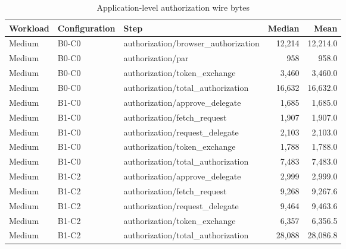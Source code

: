 \begin{table}[htbp]
\centering
\caption{Application-level authorization wire bytes}
\label{tab:evaluation-wire-bytes}
\begin{tabular}{lllrr}
\hline
Workload & Configuration & Step & Median & Mean \\
\hline
Medium & B0-C0 & authorization/browser\_authorization & 12{,}214 & 12{,}214.0 \\
Medium & B0-C0 & authorization/par & 958 & 958.0 \\
Medium & B0-C0 & authorization/token\_exchange & 3{,}460 & 3{,}460.0 \\
Medium & B0-C0 & authorization/total\_authorization & 16{,}632 & 16{,}632.0 \\
Medium & B1-C0 & authorization/approve\_delegate & 1{,}685 & 1{,}685.0 \\
Medium & B1-C0 & authorization/fetch\_request & 1{,}907 & 1{,}907.0 \\
Medium & B1-C0 & authorization/request\_delegate & 2{,}103 & 2{,}103.0 \\
Medium & B1-C0 & authorization/token\_exchange & 1{,}788 & 1{,}788.0 \\
Medium & B1-C0 & authorization/total\_authorization & 7{,}483 & 7{,}483.0 \\
Medium & B1-C2 & authorization/approve\_delegate & 2{,}999 & 2{,}999.0 \\
Medium & B1-C2 & authorization/fetch\_request & 9{,}268 & 9{,}267.6 \\
Medium & B1-C2 & authorization/request\_delegate & 9{,}464 & 9{,}463.6 \\
Medium & B1-C2 & authorization/token\_exchange & 6{,}357 & 6{,}356.5 \\
Medium & B1-C2 & authorization/total\_authorization & 28{,}088 & 28{,}086.8 \\
\hline
\end{tabular}
\par{}
\end{table}
